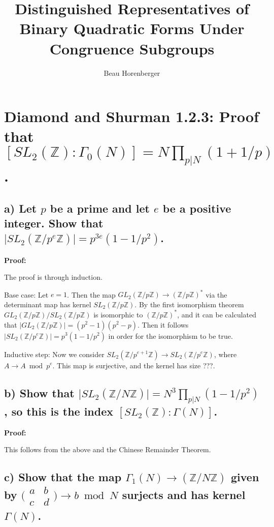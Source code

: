 \documentclass[11pt, oneside]{article}   	%
\title{Distinguished Representatives of Binary Quadratic Forms Under Congruence Subgroups}
\author{Beau Horenberger}
\begin{document}
\maketitle
\section*{Diamond and Shurman 1.2.3: Proof that  $[ SL_2(\mathbb{Z} ):\Gamma_0 (N) ] = N\prod_{p\vert N}(1+1/p)$.}

\subsection*{a) Let $p$ be a prime and let $e$ be a positive integer. Show that $\vert SL_2(\mathbb{Z}/p^e \mathbb{Z})\vert = p^{3e}(1-1/p^2)$.}

\textbf{Proof:}

The proof is through induction.

Base case: Let $e=1$. Then the map $GL_2(\mathbb{Z}/p\mathbb{Z})\rightarrow (\mathbb{Z}/p\mathbb{Z})^*$ via the determinant map has kernel $SL_2(\mathbb{Z}/p\mathbb{Z})$. By the first isomorphism theorem $GL_2(\mathbb{Z}/p\mathbb{Z})/SL_2(\mathbb{Z}/p\mathbb{Z})$ is isomorphic to $(\mathbb{Z}/p\mathbb{Z})^*$, and it can be calculated that $\vert GL_2(\mathbb{Z}/p\mathbb{Z}) \vert = (p^2-1)(p^2-p)$. Then it follows $\vert SL_2(\mathbb{Z}/p^e \mathbb{Z})\vert = p^{3}(1-1/p^2)$ in order for the isomorphism to be true.

Inductive step: Now we consider $SL_2(\mathbb{Z}/p^{e+1}\mathbb{Z})\rightarrow SL_2(\mathbb{Z}/p^e\mathbb{Z})$, where $A\rightarrow A\bmod{p^e}$. This map is surjective, and the kernel has size ???.

\subsection*{b) Show that $\vert SL_2(\mathbb{Z}/N \mathbb{Z})\vert=N^3\prod_{p\vert N} (1-1/p^2)$, so this is the index $[SL_2(\mathbb{Z}):\Gamma (N)]$.}

\textbf{Proof:}

This follows from the above and the Chinese Remainder Theorem.

\subsection*{c) Show that the map $\Gamma_1 (N)\rightarrow (\mathbb{Z}/N\mathbb{Z})$ given by $\bigl( \begin{smallmatrix}a & b\\ c & d\end{smallmatrix}\bigr) \rightarrow b \bmod{N}$ surjects and has kernel $\Gamma (N)$.}
\end{document}
